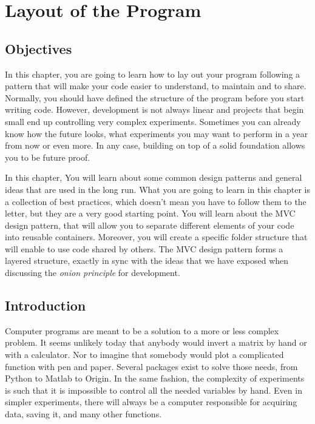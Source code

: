 \chapter{Layout of the Program}\label{layout-of-theprogram}

\section{Objectives}
In this chapter, you are going to learn how to lay out your program
following a pattern that will make your code easier to understand, to
maintain and to share. Normally, you should have defined the structure
of the program before you start writing code. However, development is
not always linear and projects that begin small end up controlling very
complex experiments. Sometimes you can already know how the future
looks, what experiments you may want to perform in a year from now or
even more. In any case, building on top of a solid foundation allows you
to be future proof.

In this chapter, You will learn about some common design patterns and
general ideas that are used in the long run. What you are going to learn
in this chapter is a collection of best practices, which doesn't mean
you have to follow them to the letter, but they are a very good starting
point. You will learn about the {MVC} design pattern, that will allow
you to separate different elements of your code into reusable
containers. Moreover, you will create a specific folder structure that
will enable to use code shared by others. The {MVC} design pattern forms
a layered structure, exactly in sync with the ideas that we have exposed
when discussing the \emph{onion principle} for development.

\section{Introduction}
Computer programs are meant to be a solution to a more or less complex
problem. It seems unlikely today that anybody would invert a matrix by
hand or with a calculator. Nor to imagine that somebody would plot a
complicated function with pen and paper. Several packages exist to solve
those needs, from Python to Matlab to Origin. In the same fashion, the
complexity of experiments is such that it is impossible to control all
the needed variables by hand. Even in simpler experiments, there will
always be a computer responsible for acquiring data, saving it, and many
other functions.

